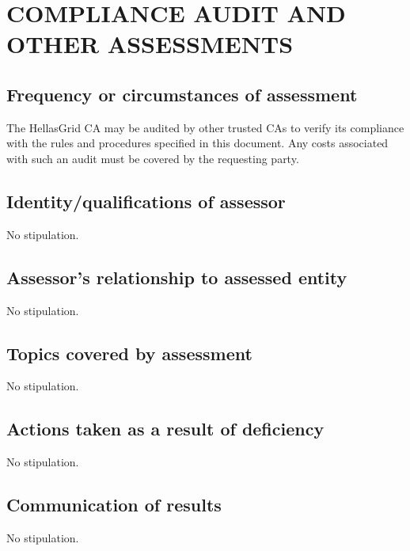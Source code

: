 
\chapter{COMPLIANCE AUDIT AND OTHER ASSESSMENTS}
\section{Frequency or circumstances of assessment}

The HellasGrid CA may be audited by other trusted CAs to verify its compliance with the rules and procedures specified in this document. Any costs associated with such an audit must be covered by the requesting party.

\section{Identity/qualifications of assessor}

No stipulation.

\section{Assessor's relationship to assessed entity}

No stipulation.

\section{Topics covered by assessment}

No stipulation.

\section{Actions taken as a result of deficiency}

No stipulation.

\section{Communication of results}

No stipulation.

